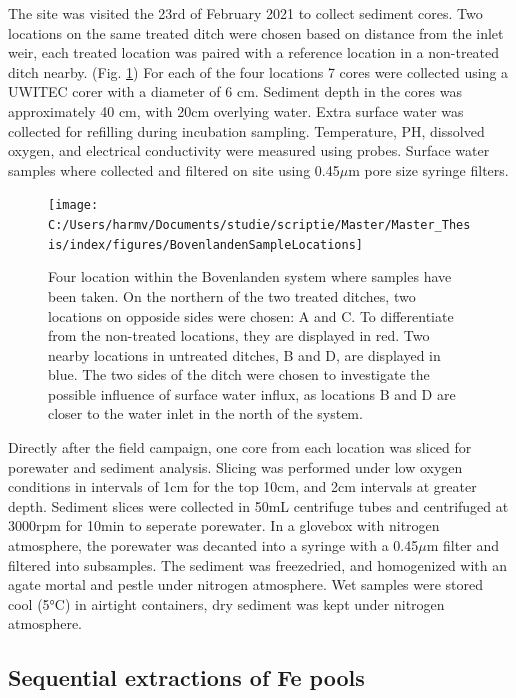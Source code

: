 \documentclass[a4paper,11pt]{article}
\begin{document}
The site was visited the 23rd of February 2021 to collect sediment cores. Two locations on the same treated ditch were chosen based on distance from the inlet weir, each treated location was paired with a reference location in a non-treated ditch nearby. (Fig. \ref{fig:sampleloc}) For each of the four locations 7 cores were collected using a UWITEC corer with a diameter of 6 cm. Sediment depth in the cores was approximately 40 cm, with 20cm overlying water. Extra surface water was collected for refilling during incubation sampling. Temperature, PH, dissolved oxygen, and electrical conductivity were measured using probes. Surface water samples where collected and filtered on site using 0.45\(\mu\)m pore size syringe filters.
\begin{figure}

{\centering \texttt{[image: C:/Users/harmv/Documents/studie/scriptie/Master/Master\_Thesis/index/figures/BovenlandenSampleLocations]} 

}

\caption{Four location within the Bovenlanden system where samples have been taken. On the northern of the two treated ditches, two locations on opposide sides were chosen: A and C. To differentiate from the non-treated locations, they are displayed in red. Two nearby locations in untreated ditches, B and D, are displayed in blue. The two sides of the ditch were chosen to investigate the possible influence of surface water influx, as locations B and D are closer to the water inlet in the north of the system. }\label{fig:sampleloc}
\end{figure}
Directly after the field campaign, one core from each location was sliced for porewater and sediment analysis. Slicing was performed under low oxygen conditions in intervals of 1cm for the top 10cm, and 2cm intervals at greater depth. Sediment slices were collected in 50mL centrifuge tubes and centrifuged at 3000rpm for 10min to seperate porewater. In a glovebox with nitrogen atmosphere, the porewater was decanted into a syringe with a 0.45\(\mu\)m filter and filtered into subsamples. The sediment was freezedried, and homogenized with an agate mortal and pestle under nitrogen atmosphere. Wet samples were stored cool (5°C) in airtight containers, dry sediment was kept under nitrogen atmosphere.

\hypertarget{sequential-extractions-of-fe-pools}{%
\subsection{Sequential extractions of Fe pools}\label{sequential-extractions-of-fe-pools}}
\end{document}
